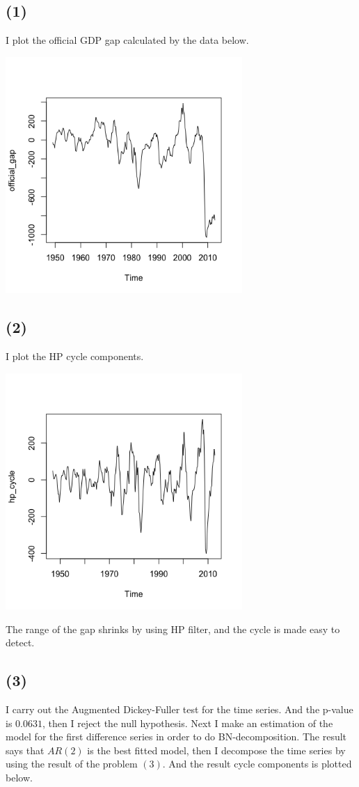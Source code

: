 \documentclass{article}
\begin{document}
 \subsection{(1)}
  I plot the official GDP gap calculated by the data below.
  
 \includegraphics[width = 9cm]{official_gap.png}
 
 \subsection{(2)}
  I plot the HP cycle components.
  
  \includegraphics[width = 9cm]{hp_cycle.png}

The range of the gap shrinks by using HP filter, and the cycle is made easy to detect.

\subsection{(3)}
 I carry out the Augmented Dickey-Fuller test for the time series. And the p-value is $0.0631$, then I reject the null hypothesis. Next I make an estimation of the model for the first difference series in order to do BN-decomposition. The result says that $AR(2)$ is the best fitted model, then I decompose the time series by using the result of the problem $(3)$. And the result cycle components is plotted below.
 
\end{document}
